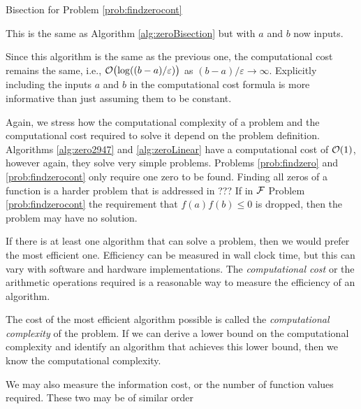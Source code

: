 \begin{algorithm}
\caption{Bisection for Problem \ref{prob:findzerocont}  \label{alg:zeroBisectionAB}}
This is the same as Algorithm \ref{alg:zeroBisection} but with $a$ and $b$ now inputs.
\end{algorithm}

Since this algorithm is the same as the previous one, the computational cost remains the same, i.e., $\operatorname{{\mathcal O}}\bigl(\log((b-a)/\varepsilon)\bigr)$ as $(b-a)/\varepsilon \to \infty$.  Explicitly including the inputs $a$ and $b$ in the computational cost formula is more informative than just assuming them to be constant.

Again, we stress how the computational complexity of a problem and the computational cost required to solve it depend on the problem definition.  Algorithms \ref{alg:zero2947} and  \ref{alg:zeroLinear} have a computational cost of $\operatorname{{\mathcal O}}(1)$, however again, they solve very simple problems.  Problems \ref{prob:findzero} and \ref{prob:findzerocont} only require one zero to be found.  Finding all zeros of a function is a harder problem that is addressed in ???  If in  $\mathcal{F}$ Problem \ref{prob:findzerocont} the requirement that $f(a) f(b) \le 0$ is dropped, then the problem may have no solution.









If there is at least one algorithm that can solve a problem, then we would prefer the most efficient one.  Efficiency can be measured in wall clock time, but this can vary with software and hardware implementations.  The \emph{computational cost} or the arithmetic operations required is a reasonable way to measure the efficiency of an algorithm. 

The cost of the most efficient algorithm possible is called the \emph{computational complexity} of the problem.  If we can derive a lower bound on the computational complexity and identify an algorithm that achieves this lower bound, then we know the computational complexity.

We may also measure the information cost, or the number of function values required.  These two may be of similar order


